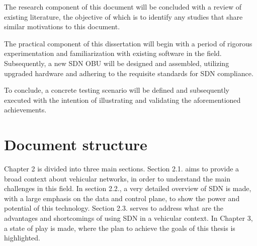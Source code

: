 The research component of this document will be concluded with a review of existing literature, the objective of which is to identify any studies that share similar motivations to this document.


The practical component of this dissertation will begin with a period of rigorous experimentation and familiarization with existing software in the field. Subsequently, a new SDN OBU will be designed and assembled, utilizing upgraded hardware and adhering to the requisite standards for SDN compliance.


To conclude, a concrete testing scenario will be defined and subsequently executed with the intention of illustrating and validating the aforementioned achievements.







\section{Document structure} %
\label{sec:document_structure}

Chapter 2 is divided into three main sections. Section 2.1. aims to provide a broad context about vehicular networks, in order to understand the main challenges in this field. In section 2.2., a very detailed overview of SDN is made, with a large emphasis on the data and control plane, to show the power and potential of this technology. Section 2.3. serves to address what are the advantages and shortcomings of using SDN in a vehicular context. 
In Chapter 3, a state of play is made, where the plan to achieve the goals of this thesis is highlighted. 


